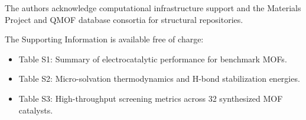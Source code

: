 \documentclass[journal=jacsat,manuscript=article]{achemso}
\begin{document}
\begin{acknowledgement}
The authors acknowledge computational infrastructure support and the Materials Project and QMOF database consortia for structural repositories.
\end{acknowledgement}

\begin{suppinfo}
The Supporting Information is available free of charge:
\begin{itemize}
    \item Table S1: Summary of electrocatalytic performance for benchmark MOFs.
    \item Table S2: Micro-solvation thermodynamics and H-bond stabilization energies.
    \item Table S3: High-throughput screening metrics across 32 synthesized MOF catalysts.
\end{itemize}
\end{suppinfo}


\end{document}

